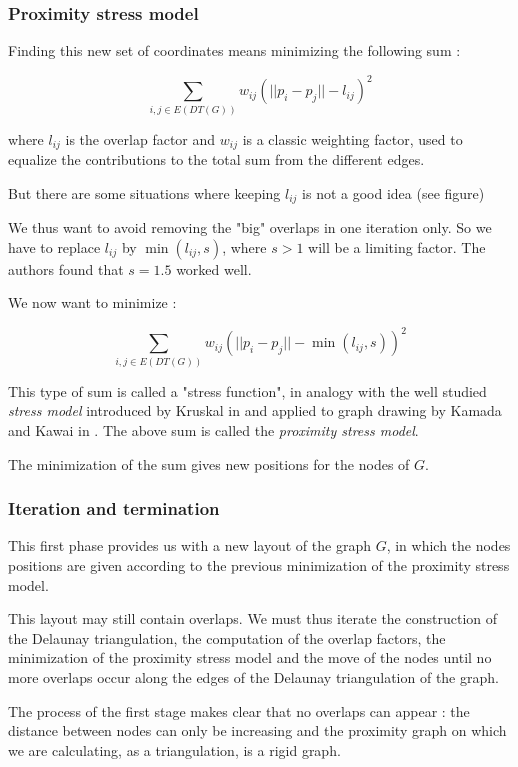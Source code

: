 \documentclass[12pt]{report}
\begin{document}
\subsubsection{Proximity stress model}

Finding this new set of coordinates means minimizing the following sum :

\[ \sum_{i,j \in E(DT(G))} w_{ij}(||p_i - p_j|| - l_{ij})^2\]

where $l_{ij}$ is the overlap factor and $w_{ij}$ is a classic weighting factor, used to equalize the contributions to the total sum from the different edges.

But there are some situations where keeping $l_{ij}$ is not a good idea (see figure) %

We thus want to avoid removing the "big" overlaps in one iteration only.
So we have to replace $l_{ij}$ by $\min(l_{ij},s)$, where $s > 1$ will be a limiting factor. The authors found that $s = 1.5$ worked well.

We now want to minimize :

\[ \sum_{i,j \in E(DT(G))} w_{ij}(||p_i - p_j|| - \min(l_{ij},s))^2\]

This type of sum is called a "stress function", in analogy with the well studied \emph{stress model} introduced by Kruskal in \cite{Kr64} and applied to graph drawing by Kamada and Kawai in \cite{KK89}. 
The above sum is called the \emph{proximity stress model}.

\bigskip
The minimization of the sum gives new positions for the nodes of $G$.

\subsubsection{Iteration and termination}
This first phase provides us with a new layout of the graph $G$, in which the nodes positions are given according to the previous minimization of the proximity stress model.

This layout may still contain overlaps. We must thus iterate the construction of the Delaunay triangulation, the computation of the overlap factors, the minimization of the proximity stress model and the move of the nodes until no more overlaps occur along the edges of the Delaunay triangulation of the graph.

\bigskip
The process of the first stage makes clear that no overlaps can appear : the distance between nodes can only be increasing and the proximity graph on which we are calculating, as a triangulation, is a rigid graph.
\end{document}
